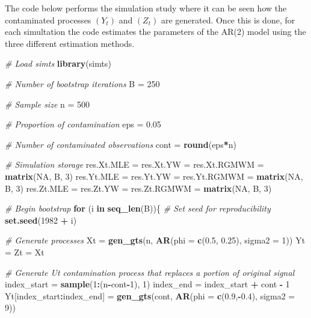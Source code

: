 \documentclass[]{book}
\newenvironment{Shaded}{\begin{snugshade}}{\end{snugshade}}
\newcommand{\KeywordTok}[1]{\textcolor[rgb]{0.13,0.29,0.53}{\textbf{#1}}}
\newcommand{\DataTypeTok}[1]{\textcolor[rgb]{0.13,0.29,0.53}{#1}}
\newcommand{\DecValTok}[1]{\textcolor[rgb]{0.00,0.00,0.81}{#1}}
\newcommand{\FloatTok}[1]{\textcolor[rgb]{0.00,0.00,0.81}{#1}}
\newcommand{\StringTok}[1]{\textcolor[rgb]{0.31,0.60,0.02}{#1}}
\newcommand{\CommentTok}[1]{\textcolor[rgb]{0.56,0.35,0.01}{\textit{#1}}}
\newcommand{\OtherTok}[1]{\textcolor[rgb]{0.56,0.35,0.01}{#1}}
\newcommand{\ControlFlowTok}[1]{\textcolor[rgb]{0.13,0.29,0.53}{\textbf{#1}}}
\newcommand{\OperatorTok}[1]{\textcolor[rgb]{0.81,0.36,0.00}{\textbf{#1}}}
\newcommand{\NormalTok}[1]{#1}
\theoremstyle{definition}
\theoremstyle{definition}
\theoremstyle{definition}
\theoremstyle{remark}
\begin{document}
The code below performs the simulation study where it can be seen how
the contaminated processes \((Y_t)\) and \((Z_t)\) are generated. Once
this is done, for each simultation the code estimates the parameters of
the AR(2) model using the three different estimation methods.

\begin{Shaded}
\begin{Highlighting}[]
\CommentTok{# Load simts}
\KeywordTok{library}\NormalTok{(simts)}

\CommentTok{# Number of bootstrap iterations}
\NormalTok{B =}\StringTok{ }\DecValTok{250}

\CommentTok{# Sample size}
\NormalTok{n =}\StringTok{ }\DecValTok{500}

 \CommentTok{# Proportion of contamination}
\NormalTok{eps =}\StringTok{ }\FloatTok{0.05}       

\CommentTok{# Number of contaminated observations}
\NormalTok{cont =}\StringTok{ }\KeywordTok{round}\NormalTok{(eps}\OperatorTok{*}\NormalTok{n)   }

\CommentTok{# Simulation storage}
\NormalTok{res.Xt.MLE =}\StringTok{ }\NormalTok{res.Xt.YW =}\StringTok{ }\NormalTok{res.Xt.RGMWM =}\StringTok{ }\KeywordTok{matrix}\NormalTok{(}\OtherTok{NA}\NormalTok{, B, }\DecValTok{3}\NormalTok{)}
\NormalTok{res.Yt.MLE =}\StringTok{ }\NormalTok{res.Yt.YW =}\StringTok{ }\NormalTok{res.Yt.RGMWM =}\StringTok{ }\KeywordTok{matrix}\NormalTok{(}\OtherTok{NA}\NormalTok{, B, }\DecValTok{3}\NormalTok{)}
\NormalTok{res.Zt.MLE =}\StringTok{ }\NormalTok{res.Zt.YW =}\StringTok{ }\NormalTok{res.Zt.RGMWM =}\StringTok{ }\KeywordTok{matrix}\NormalTok{(}\OtherTok{NA}\NormalTok{, B, }\DecValTok{3}\NormalTok{)}
  
\CommentTok{# Begin bootstrap}
\ControlFlowTok{for}\NormalTok{ (i }\ControlFlowTok{in} \KeywordTok{seq_len}\NormalTok{(B))\{}
  \CommentTok{# Set seed for reproducibility}
  \KeywordTok{set.seed}\NormalTok{(}\DecValTok{1982} \OperatorTok{+}\StringTok{ }\NormalTok{i)}
  
  \CommentTok{# Generate processes}
\NormalTok{  Xt =}\StringTok{ }\KeywordTok{gen_gts}\NormalTok{(n, }\KeywordTok{AR}\NormalTok{(}\DataTypeTok{phi =} \KeywordTok{c}\NormalTok{(}\FloatTok{0.5}\NormalTok{, }\FloatTok{0.25}\NormalTok{), }\DataTypeTok{sigma2 =} \DecValTok{1}\NormalTok{))}
\NormalTok{  Yt =}\StringTok{ }\NormalTok{Zt =}\StringTok{ }\NormalTok{Xt}
  
  \CommentTok{# Generate Ut contamination process that replaces a portion of original signal}
\NormalTok{  index_start =}\StringTok{ }\KeywordTok{sample}\NormalTok{(}\DecValTok{1}\OperatorTok{:}\NormalTok{(n}\OperatorTok{-}\NormalTok{cont}\OperatorTok{-}\DecValTok{1}\NormalTok{), }\DecValTok{1}\NormalTok{)}
\NormalTok{  index_end =}\StringTok{ }\NormalTok{index_start }\OperatorTok{+}\StringTok{ }\NormalTok{cont }\OperatorTok{-}\StringTok{ }\DecValTok{1}
\NormalTok{  Yt[index_start}\OperatorTok{:}\NormalTok{index_end] =}\StringTok{ }\KeywordTok{gen_gts}\NormalTok{(cont, }\KeywordTok{AR}\NormalTok{(}\DataTypeTok{phi =} \KeywordTok{c}\NormalTok{(}\FloatTok{0.9}\NormalTok{,}\OperatorTok{-}\FloatTok{0.4}\NormalTok{), }\DataTypeTok{sigma2 =} \DecValTok{9}\NormalTok{))}
  

\end{Highlighting}
\end{Shaded}
\end{document}
